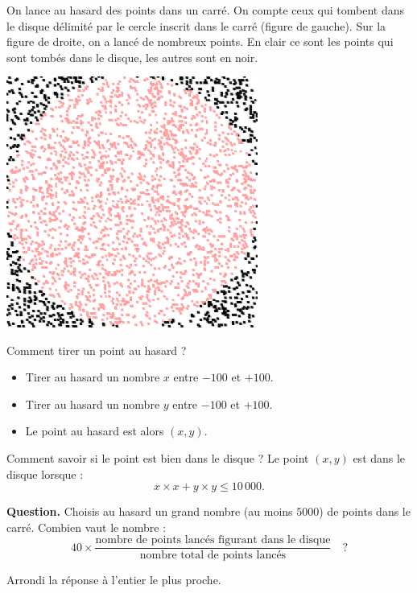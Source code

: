 \documentclass[class=report,crop=false, 12pt]{standalone}
\begin{document}
\begin{enigme}


On lance au hasard des points dans un carré. On compte ceux qui tombent dans le disque délimité par le cercle inscrit dans le carré (figure de gauche). Sur la figure de droite, on a lancé de nombreux points. En clair ce sont les points qui sont tombés dans le disque, les autres sont en noir.

\begin{center}
\begin{minipage}{0.49\textwidth}
\end{minipage}
\begin{minipage}{0.49\textwidth}
\includegraphics[width=0.62\textwidth]{ecran-06-eg3bis} 
\end{minipage}
\end{center}

\bigskip

Comment tirer un point au hasard ?
\begin{itemize}
  \item Tirer au hasard un nombre $x$ entre $-100$ et $+100$.
  \item Tirer au hasard un nombre $y$ entre $-100$ et $+100$.
  \item Le point au hasard est alors $(x,y)$.
\end{itemize}

\bigskip

Comment savoir si le point est bien dans le disque ?
Le point $(x,y)$  est dans le disque lorsque :
$$x \times x + y \times y \le 10\,000.$$

  


\bigskip

\textbf{Question.} Choisis au hasard un grand nombre (au moins $5 000$) de points dans le carré.
Combien vaut le nombre :
$$40 \times \frac{\text{nombre de points lancés figurant dans le disque}}{\text{nombre total de points lancés}} \quad ?$$

Arrondi la réponse à l'entier le plus proche.

\bigskip



\end{enigme}
\end{document}
